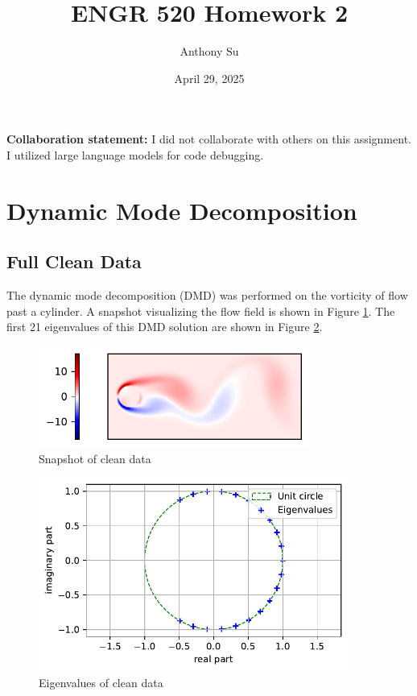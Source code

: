 \documentclass[11pt]{article}
\title{ENGR 520 Homework 2}
\author{Anthony Su}
\date{April 29, 2025}
\begin{document}
\thispagestyle{plain}
\maketitle


\textbf{Collaboration statement:} I did not collaborate with others on this assignment. I utilized large language models for code debugging.


\section{Dynamic Mode Decomposition}

\subsection{Full Clean Data} %

The dynamic mode decomposition (DMD) was performed on the vorticity of flow past a cylinder. A snapshot visualizing the flow field is shown in Figure \ref{fig1a1}. The first 21 eigenvalues of this DMD solution are shown in Figure \ref{fig1a2}.

\begin{figure}[H]
    \centering
    \includegraphics[width=3.5in]{fig1a_snapshot.pdf}
    \caption{Snapshot of clean data}
    \label{fig1a1}
\end{figure}

\begin{figure}[H]
    \centering
    \includegraphics[width=4in]{fig1a_eigs.pdf}
    \caption{Eigenvalues of clean data}
    \label{fig1a2}
\end{figure}
\end{document}
